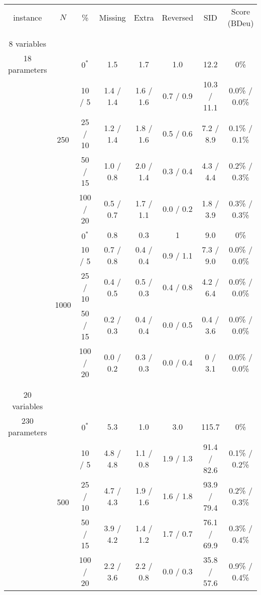\documentclass[twoside,11pt]{article}
\begin{document}
\begin{table}[ht]
\scriptsize
\centering
\renewcommand\theadfont{}
\begin{tabular}{ c | c | c || c | c | c | c | c  }

instance & $N$ & \% & Missing & Extra & Reversed & SID & Score (BDeu) \\

\hhline{=|=|=||=|=|=|=|=}
\multirow{10}{*}{\thead{\textbf{asia} \\ \\ 8 variables \\ 18 parameters}} & \multirow{5}{*}{250} 
& $0^*$ & 1.5 & 1.7 & 1.0 & 12.2 & 0\% \\
& & 10 / 5 & 1.4 / 1.4 & 1.6 / 1.6 & 0.7 / 0.9 & 10.3 / 11.1 & 0.0\% / 0.0\% \\
& & 25 / 10 & 1.2 / 1.4 & 1.8 / 1.6 & 0.5 / 0.6 & 7.2 / 8.9 & 0.1\% / 0.1\% \\
& & 50 / 15 & 1.0 / 0.8 & 2.0 / 1.4 & 0.3 / 0.4 & 4.3 / 4.4 & 0.2\% / 0.3\% \\
& & 100 / 20 & 0.5 / 0.7 & 1.7 / 1.1 & 0.0 / 0.2 & 1.8 / 3.9 & 0.3\% / 0.3\% \\

\hhline{~|-|-||-|-|-|-|-} 
& \multirow{5}{*}{1000}
& $0^*$ & 0.8 & 0.3 & 1 & 9.0 & 0\% \\
& & 10 / 5 & 0.7 / 0.8 & 0.4 / 0.4 & 0.9 / 1.1 & 7.3 / 9.0 & 0.0\% / 0.0\% \\
& & 25 / 10 & 0.4 / 0.5 & 0.5 / 0.3 & 0.4 / 0.8 & 4.2 / 6.4 & 0.0\% / 0.0\% \\
& & 50 / 15 & 0.2 / 0.3 & 0.4 / 0.4 & 0.0 / 0.5 & 0.4 / 3.6 & 0.0\% / 0.0\% \\
& & 100 / 20 & 0.0 / 0.2 & 0.3 / 0.3 & 0.0 / 0.4 & 0 / 3.1 & 0.0\% / 0.0\% \\

\hhline{=|=|=||=|=|=|=|=}

\multirow{10}{*}{\thead{\textbf{child} \\ \\ 20 variables \\ 230 parameters}}  & \multirow{5}{*}{500}

& $0^*$ & 5.3 & 1.0 & 3.0 & 115.7 & 0\% \\
& & 10 / 5 & 4.8 / 4.8 & 1.1 / 0.8 & 1.9 / 1.3 & 91.4 / 82.6 & 0.1\% / 0.2\% \\
& & 25 / 10 & 4.7 / 4.3 & 1.9 / 1.6 & 1.6 / 1.8 & 93.9 / 79.4 & 0.2\% / 0.3\% \\
& & 50 / 15 & 3.9 / 4.2 & 1.4 / 1.2 & 1.7 / 0.7 & 76.1 / 69.9 & 0.3\% / 0.4\% \\
& & 100 / 20 & 2.2 / 3.6 & 2.2 / 0.8 & 0.0 / 0.3 & 35.8 / 57.6 & 0.9\% / 0.4\% \\



\end{tabular}
\end{table}
\end{document}
